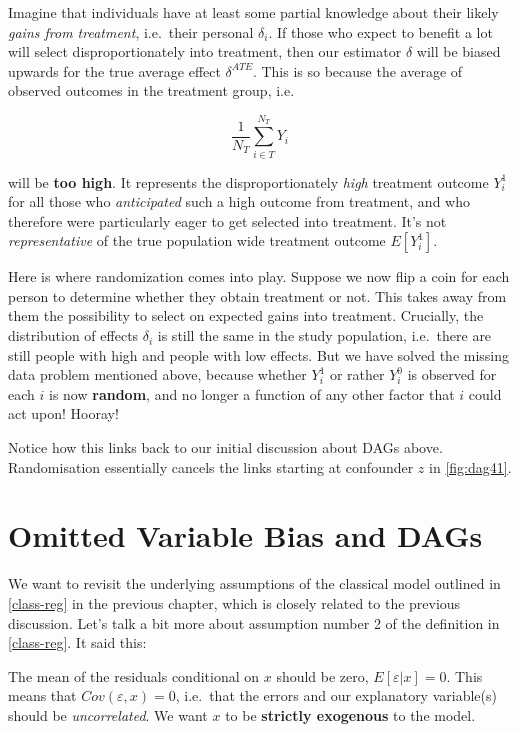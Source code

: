 \documentclass[]{book}
\newenvironment{warning}{\begin{tcolorbox}[colback=orange!5!white,colframe=orange]}{\end{tcolorbox}}
\begin{document}
Imagine that individuals have at least some partial knowledge about
their likely \emph{gains from treatment}, i.e.~their personal
\(\delta_i\). If those who expect to benefit a lot will select
disproportionately into treatment, then our estimator \(\hat{\delta}\)
will be biased upwards for the true average effect \(\delta^{ATE}\).
This is so because the average of observed outcomes in the treatment
group, i.e.

\[
\frac{1}{N_T} \sum_{i \in T}^{N_T} Y_i
\]

will be \textbf{too high}. It represents the disproportionately
\emph{high} treatment outcome \(Y_i^1\) for all those who
\emph{anticipated} such a high outcome from treatment, and who therefore
were particularly eager to get selected into treatment. It's not
\emph{representative} of the true population wide treatment outcome
\(E[Y_i^1]\).

Here is where randomization comes into play. Suppose we now flip a coin
for each person to determine whether they obtain treatment or not. This
takes away from them the possibility to select on expected gains into
treatment. Crucially, the distribution of effects \(\delta_i\) is still
the same in the study population, i.e.~there are still people with high
and people with low effects. But we have solved the missing data problem
mentioned above, because whether \(Y_i^1\) or rather \(Y_i^0\) is
observed for each \(i\) is now \textbf{random}, and no longer a function
of any other factor that \(i\) could act upon! Hooray!

Notice how this links back to our initial discussion about DAGs above.
Randomisation essentially cancels the links starting at confounder \(z\)
in \ref{fig:dag41}.

\section{Omitted Variable Bias and
DAGs}\label{omitted-variable-bias-and-dags}

We want to revisit the underlying assumptions of the classical model
outlined in \ref{class-reg} in the previous chapter, which is closely
related to the previous discussion. Let's talk a bit more about
assumption number 2 of the definition in \ref{class-reg}. It said this:

\begin{warning}
The mean of the residuals conditional on \(x\) should be zero,
\(E[\varepsilon|x] = 0\). This means that \(Cov(\varepsilon,x) = 0\),
i.e.~that the errors and our explanatory variable(s) should be
\emph{uncorrelated}. We want \(x\) to be \textbf{strictly exogenous} to
the model.
\end{warning}
\end{document}
